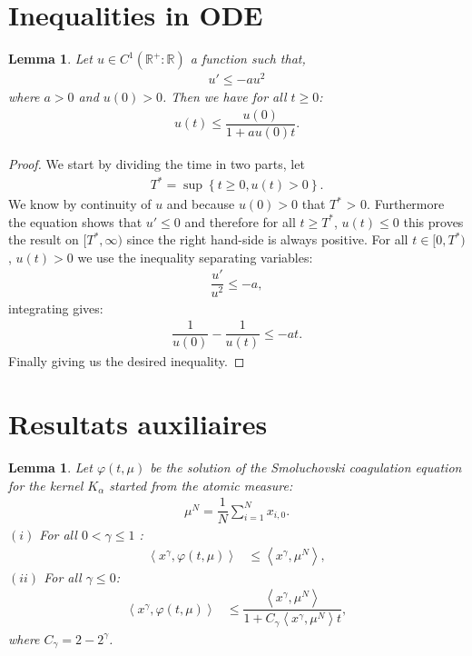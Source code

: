 \documentclass[11pt,a4paper]{article}
\newcommand{\RR}{\mathbb{R}}
\newtheorem{lemma}[theorem]{Lemma}
\begin{document}
\section{Inequalities in ODE}

\begin{lemma}\label{lem:inequality_ODE_square}
    Let $u \in C^1\left(\RR^+ : \RR \right)$ a function such that,
    \begin{align*}
        u' \leq -a u^2
    \end{align*}
    where $a > 0$ and $u(0) > 0$. Then we have for all $t\geq 0$:
    \begin{align*}
        u(t) \leq \dfrac{u(0)}{1 + au(0)t}.
    \end{align*}
\end{lemma}
\begin{proof}
    We start by dividing the time in two parts, let
    \begin{align*}
        T^* = \sup\left\lbrace t \geq 0, u(t) > 0 \right\rbrace.
    \end{align*}
    We know by continuity of $u$ and because $u(0) > 0$ that $T^*$ > 0. Furthermore the equation shows that $u' \leq 0$ and therefore for all $t \geq T^*$, $u(t) \leq 0$ this proves the result on $[T^*,\infty)$ since the right hand-side is always positive. For all $t \in [0,T^*)$, $u(t) > 0$ we use the inequality separating variables:
    \begin{align*}
        \dfrac{u'}{u^2} \leq -a, 
    \end{align*}
    integrating gives:
    \begin{align*}
        \dfrac{1}{u(0)} - \dfrac{1}{u(t)} \leq -at.
    \end{align*}
    Finally giving us the desired inequality.
\end{proof}
\section{Resultats auxiliaires}
\begin{lemma}
    Let $\varphi\left(t,\mu\right)$ be the solution of the Smoluchovski coagulation equation for the kernel $K_\alpha$ started from the atomic measure:
    \begin{align*}
        \mu^N = \dfrac{1}{N}\sum\limits_{i = 1}^N x_{i,0}.
    \end{align*}
    $(i)$ For all $0 < \gamma \leq 1$ :
    \begin{align*}
        \left\langle x^\gamma, \varphi\left(t,\mu\right) \right\rangle &\leq \left\langle x^\gamma, \mu^N \right\rangle,
    \end{align*}
    $(ii)$ For all $\gamma \leq 0$:
    \begin{align*}
        \left\langle x^\gamma, \varphi\left(t,\mu\right) \right\rangle &\leq \dfrac{\left\langle x^\gamma, \mu^N \right\rangle}{1 + C_\gamma\left\langle x^{\gamma}, \mu^N \right\rangle t } ,
    \end{align*}
    where $C_\gamma = 2 - 2^{\gamma}$.
\end{lemma}
\end{document}
